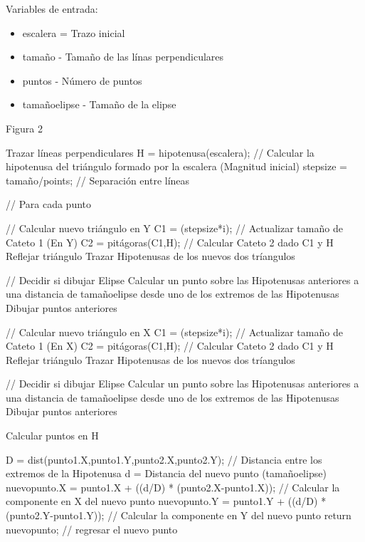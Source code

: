 \documentclass[letter,10pt]{article}
\begin{document}
 

Variables de entrada:
\begin{itemize}
	\item  escalera = Trazo inicial
	\item  tamaño - Tamaño de las línas perpendiculares
	\item  puntos - Número de puntos
	\item tamañoelipse - Tamaño de la elipse
\end{itemize}

\begin{algorithm}
	\caption{Figura 2} 
	\begin{algorithmic}[1]

		\State Trazar líneas perpendiculares
		\State H = hipotenusa(escalera); // Calcular la hipotenusa del triángulo formado por la escalera (Magnitud inicial)
		\State stepsize = tamaño/points; // Separación entre líneas

		 // Para cada punto

			\State // Calcular nuevo triángulo en Y
			\State  C1 = (stepsize*i);   // Actualizar tamaño de Cateto 1 (En Y)
			\State  C2 = pitágoras(C1,H); // Calcular Cateto 2 dado C1 y H
			\State  Reflejar triángulo
			\State 	Trazar Hipotenusas de los nuevos dos tríangulos
			
			 // Decidir si dibujar Elipse
				\State Calcular un punto sobre las Hipotenusas anteriores a una distancia de tamañoelipse desde uno de los extremos de las Hipotenusas
				\State Dibujar puntos anteriores
			\EndIf

			\State // Calcular nuevo triángulo en X
			\State  C1 = (stepsize*i);   // Actualizar tamaño de Cateto 1 (En X)
			\State  C2 = pitágoras(C1,H); // Calcular Cateto 2 dado C1 y H
			\State  Reflejar triángulo
			\State 	Trazar Hipotenusas de los nuevos dos tríangulos
			
			 // Decidir si dibujar Elipse
				\State Calcular un punto sobre las Hipotenusas anteriores a una distancia de tamañoelipse desde uno de los extremos de las Hipotenusas
				\State Dibujar puntos anteriores
			\EndIf
		\EndFor
	\end{algorithmic} 
\end{algorithm}

\begin{algorithm}
	\caption{Calcular puntos en H} 
	\begin{algorithmic}[1]
        \State D = dist(punto1.X,punto1.Y,punto2.X,punto2.Y); // Distancia entre los extremos de la Hipotenusa
        \State d = Distancia del nuevo punto (tamañoelipse)
        \State nuevopunto.X = punto1.X + ((d/D) * (punto2.X-punto1.X)); // Calcular la componente en X del nuevo punto
        \State nuevopunto.Y = punto1.Y + ((d/D) * (punto2.Y-punto1.Y)); // Calcular la componente en Y del nuevo punto
        \State return nuevopunto; // regresar el nuevo punto
	\end{algorithmic} 
\end{algorithm}
\end{document}
